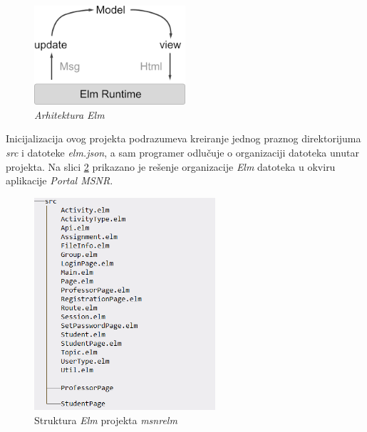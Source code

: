 \documentclass[12pt,oneside]{memoir}
\begin{document}
\begin{figure}[!ht]
  \centering
  \includegraphics[width=0.5\textwidth]{elmprog.png}
  \caption{\emph{Arhitektura Elm} \cite{rad}}
  \label{fig:elm-prog}
\end{figure}


\par Inicijalizacija ovog projekta podrazumeva kreiranje jednog praznog direktorijuma \emph{src} i datoteke \emph{elm.json}, a sam programer odlučuje o organizaciji datoteka unutar projekta. Na slici \ref{fig:msnrelm} prikazano je rešenje organizacije \emph{Elm} datoteka u okviru aplikacije \emph{Portal MSNR}. 


\begin{figure}[!ht]
  \centering
  \includegraphics[width=0.6\textwidth]{msnr-elm.png}
  \caption{Struktura \emph{Elm} projekta \emph{msnr{\textunderscore}elm} \cite{rad}}
  \label{fig:msnrelm}
\end{figure}
\end{document}
